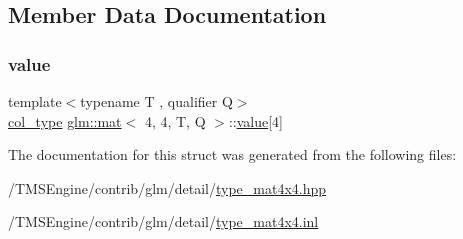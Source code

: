\subsection{Member Data Documentation}
\mbox{\label{structglm_1_1mat_3_014_00_014_00_01_t_00_01_q_01_4_a43dd26acc0a0d26257b38393edc53328}} 
\subsubsection{\texorpdfstring{value}{value}}
{\footnotesize\ttfamily template$<$typename T , qualifier Q$>$ \\
\hyperlink{structglm_1_1mat_3_014_00_014_00_01_t_00_01_q_01_4_aad430dc291d0156d573c434be7fdecc1}{col\+\_\+type} \hyperlink{structglm_1_1mat}{glm\+::mat}$<$ 4, 4, T, Q $>$\+::\hyperlink{_s_d_l__opengl__glext_8h_a8ad81492d410ff2ac11f754f4042150f}{value}\mbox{[}4\mbox{]}\hspace{0.3cm}{\ttfamily [private]}}



The documentation for this struct was generated from the following files\+:\begin{DoxyCompactItemize}
\item 
/\+T\+M\+S\+Engine/contrib/glm/detail/\hyperlink{type__mat4x4_8hpp}{type\+\_\+mat4x4.\+hpp}\item 
/\+T\+M\+S\+Engine/contrib/glm/detail/\hyperlink{type__mat4x4_8inl}{type\+\_\+mat4x4.\+inl}\end{DoxyCompactItemize}
